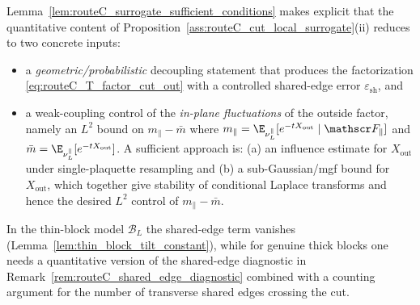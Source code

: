 \begin{remark}
Lemma~\ref{lem:routeC_surrogate_sufficient_conditions} makes explicit that the quantitative content of
Proposition~\ref{ass:routeC_cut_local_surrogate}(ii) reduces to two concrete inputs:
\begin{itemize}
\item a \emph{geometric/probabilistic} decoupling statement that produces the factorization \eqref{eq:routeC_T_factor_cut_out} with a controlled
shared-edge error $\varepsilon_{\mathrm{sh}}$, and
\item a weak-coupling control of the \emph{in-plane fluctuations} of the outside factor, namely an $L^2$ bound on
$m_\parallel-\bar m$ where $m_\parallel=\E_{\nu_L^{\parallel}}[e^{-tX_{\mathrm{out}}}\mid\mathscr F_\parallel]$ and $\bar m=\E_{\nu_L^{\parallel}}[e^{-tX_{\mathrm{out}}}]$.
A sufficient approach is: (a) an influence estimate for $X_{\mathrm{out}}$ under single-plaquette resampling and (b) a sub-Gaussian/mgf bound for $X_{\mathrm{out}}$,
which together give stability of conditional Laplace transforms and hence the desired $L^2$ control of $m_\parallel-\bar m$.
\end{itemize}
In the thin-block model $\mathcal B_L$ the shared-edge term vanishes (Lemma~\ref{lem:thin_block_tilt_constant}),
while for genuine thick blocks one needs a quantitative version of the shared-edge diagnostic in
Remark~\ref{rem:routeC_shared_edge_diagnostic} combined with a counting argument for the number of transverse shared edges crossing the cut.
\end{remark}

